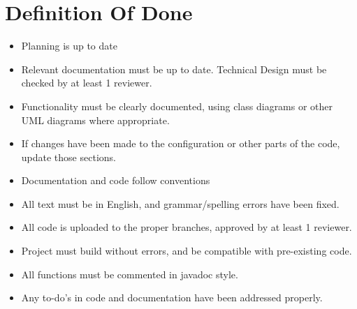 \section{Definition Of Done}
\begin{itemize}
\item Planning is up to date
\item Relevant documentation must be up to date. Technical Design must be checked by at least 1 reviewer.
\item Functionality must be clearly documented, using class diagrams or other UML diagrams where appropriate.
\item If changes have been made to the configuration or other parts of the code, update those sections.
\item Documentation and code follow conventions
\item All text must be in English, and grammar/spelling errors have been fixed.
\item All code is uploaded to the proper branches, approved by at least 1 reviewer.
\item Project must build without errors, and be compatible with pre-existing code.
\item All functions must be commented in javadoc style.
\item Any to-do's in code and documentation have been addressed properly.
\end{itemize}
\newpage

